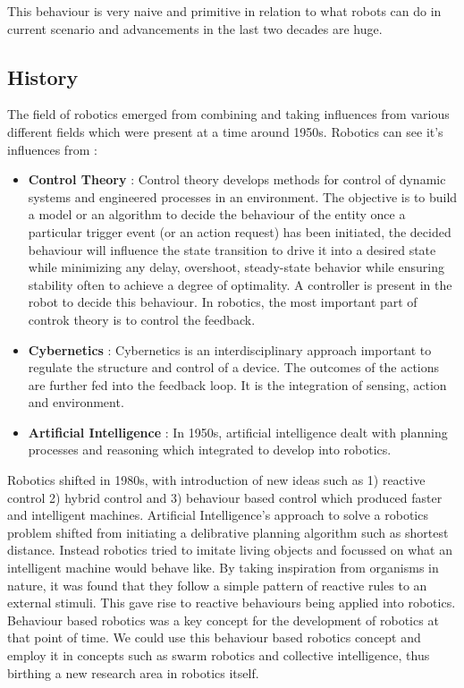 This behaviour is very naive and primitive in relation to what robots can do in current scenario and advancements in the last two decades are huge.

\subsection{History}
The field of robotics emerged from combining and taking influences from various different fields which were present at a time around 1950s.
Robotics can see it's influences from : 
\begin{itemize}
    \item \textbf{Control Theory} : Control theory \cite{enwiki:1039308545} develops methods for control of dynamic systems and engineered processes in an environment. The objective is to build a model or an algorithm to decide the behaviour of the entity once a particular trigger event (or an action request) has been initiated, the decided behaviour will influence the state transition to drive it into a desired state while minimizing any delay, overshoot, steady-state behavior while ensuring stability often to achieve a degree of optimality. A controller is present in the robot to decide this behaviour. In robotics, the most important part of controk theory is to control the feedback.
    \item \textbf{Cybernetics} : Cybernetics \cite{enwiki:1037814219} is an interdisciplinary approach important to regulate the structure and control of a device. The outcomes of the actions are further fed into the feedback loop. It is the integration of sensing, action and environment. 
    \item \textbf{Artificial Intelligence} : In 1950s, artificial intelligence dealt with planning processes and reasoning which integrated to develop into robotics.
\end{itemize}
Robotics shifted in 1980s, with introduction of new ideas such as 1) reactive control 2) hybrid control and 3) behaviour based control which produced faster and intelligent machines. Artificial Intelligence's approach to solve a robotics problem shifted from initiating
a delibrative planning algorithm such as shortest distance. Instead robotics tried to imitate living objects and focussed on what an intelligent machine would behave like. By taking inspiration from organisms in nature, it was found that they follow a simple pattern of reactive rules to an external stimuli. This gave rise to reactive behaviours being applied into robotics.
Behaviour based robotics was a key concept for the development of robotics at that point of time.  We could use this behaviour based robotics concept and employ it in concepts such as swarm robotics and collective intelligence, thus birthing a new research area in robotics itself.
